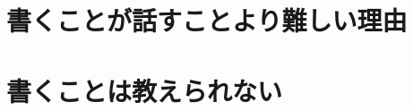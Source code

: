 \documentclass[11pt,oneside]{book}
\begin{document}
\part{書くことが話すことより難しい理由}












\part{書くことは教えられない}

\end{document}

